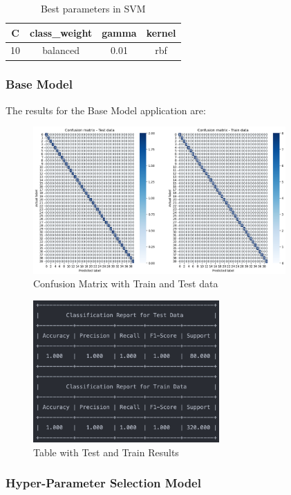 \documentclass[conference]{IEEEtran}
\begin{document}
\begin{table}[ht!]
    \centering
    \caption{Best parameters in SVM} 
    \begin{tabular}{||c c c c||} 
     \hline
     C & class\_weight & gamma & kernel \\ [0.5ex] 
     \hline\hline
     10 & balanced & 0.01 & rbf \\ 
    \hline
    \end{tabular}
    \label{tab:tab-svc}
\end{table}
\subsubsection{Base Model}
The results for the Base Model application are:

\begin{figure}[!h!]
    \includegraphics[width=3.8in]{SVC/1.png}%
    \caption{Confusion Matrix with Train and Test data}%
    \label{fig:conf_gnb_1}%
\end{figure}

\begin{figure}[!h!]
    \includegraphics[width=2.8in]{SVC/r_1.png}%
    \caption{Table with Test and Train Results}%
    \label{fig:conf_gnb_r_1}%
\end{figure}

\subsubsection{Hyper-Parameter Selection Model}
\end{document}
